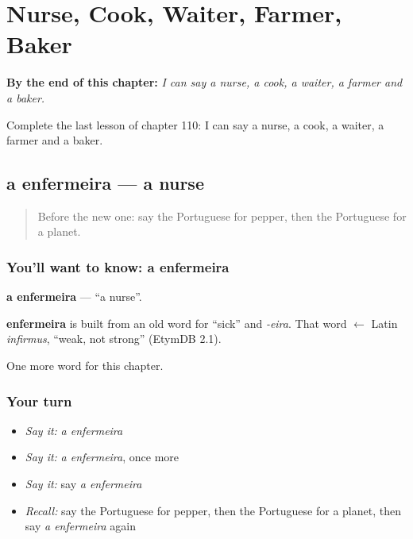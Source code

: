 
\chapter{Nurse, Cook, Waiter, Farmer, Baker}
\label{ch:pt-nurse-cook-waiter-farmer-baker}

\begin{chapteropening}
\textbf{By the end of this chapter:} \emph{I can say a nurse, a cook, a waiter, a farmer and a baker.}

Complete the last lesson of chapter 110: I can say a nurse, a cook, a waiter, a farmer and a baker.
\end{chapteropening}

\section[a enfermeira]{a enfermeira — a nurse}

\label{lesson:PT-C110-enfermeira}



\begin{quote}
Before the new one: say the Portuguese for pepper, then the Portuguese for a planet.
\end{quote}

\subsection*{You'll want to know: a enfermeira}
\textbf{a enfermeira} — \textquotedblleft{}a nurse\textquotedblright{}.

\begin{cousinweb}
\textbf{enfermeira} is built from an old word for \textquotedblleft{}sick\textquotedblright{} and \emph{-eira}. That word $\leftarrow$ Latin \emph{infirmus}, \textquotedblleft{}weak, not strong\textquotedblright{} (EtymDB 2.1).
\end{cousinweb}

\begin{grammarlens}[title={What you've built}]
One more word for this chapter.
\end{grammarlens}

\subsection*{Your turn}
\begin{itemize}
\raggedright
  \item \emph{Say it:} \emph{a enfermeira}
  \item \emph{Say it:} \emph{a enfermeira}, once more
  \item \emph{Say it:} say \emph{a enfermeira}
  \item \emph{Recall:} say the Portuguese for pepper, then the Portuguese for a planet, then say \emph{a enfermeira} again
\end{itemize}

